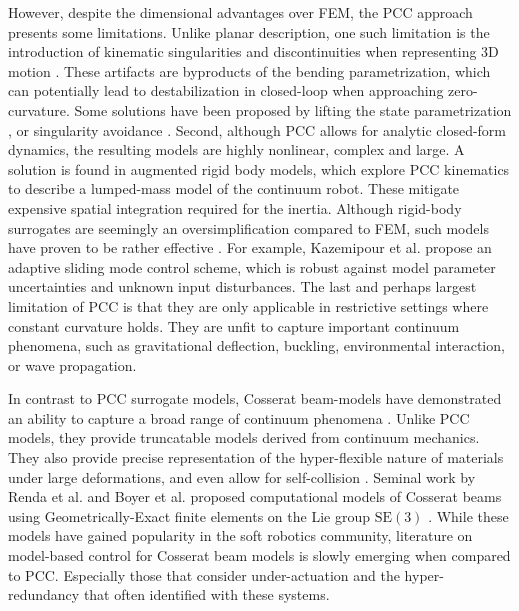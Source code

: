 However, despite the dimensional advantages over FEM, the PCC approach presents some limitations. Unlike planar description, one such limitation is the introduction of kinematic singularities and discontinuities when representing 3D motion \cite{Jones2006,Jones2007Apr}. These artifacts are byproducts of the bending parametrization, which can potentially lead to destabilization in closed-loop when approaching zero-curvature. Some solutions have been proposed by lifting the state parametrization \cite{DellaSantina2020Jan}, or singularity avoidance \cite{Falkenhahn2015,Tatlicioglu2007}. Second, although PCC allows for analytic closed-form dynamics, the resulting models are highly nonlinear, complex and large. A solution is found in augmented rigid body models, which explore PCC kinematics to describe a lumped-mass model of the continuum robot. These mitigate  expensive spatial integration required for the inertia. Although rigid-body surrogates are seemingly an oversimplification compared to FEM, such models have proven to be rather effective \cite{DellaSantina2020, Kazemipour2022May, Katzschmann2019,Franco2020,Franco2022}. For example, Kazemipour et al. \cite{Kazemipour2022May} propose an adaptive sliding mode control scheme, which is robust against model parameter uncertainties and unknown input disturbances. The last and perhaps largest limitation of PCC is that they are only applicable in restrictive settings where constant curvature holds. They are unfit to capture important continuum phenomena, such as gravitational deflection, buckling, environmental interaction, or wave propagation.

In contrast to PCC surrogate models, Cosserat beam-models have demonstrated an ability to capture a broad range of continuum phenomena \cite{Gazzola2018,Renda2017Aug,Renda2018,Boyer2010,Till2019}. Unlike PCC models, they provide truncatable models derived from continuum mechanics. They also provide precise representation of the hyper-flexible nature of materials under large deformations, and even allow for self-collision \cite{Gazzola2018}. Seminal work by Renda et al. \cite{Renda2018,Renda2020} and Boyer et al. \cite{Boyer2021} proposed computational models of Cosserat beams using Geometrically-Exact finite elements on the Lie group $\textrm{SE}(3)$ \cite{Simo1986}. While these models have gained popularity in the soft robotics community, literature on model-based control for Cosserat beam models is slowly emerging when compared to PCC. Especially those that consider under-actuation and the hyper-redundancy that often identified with these systems.